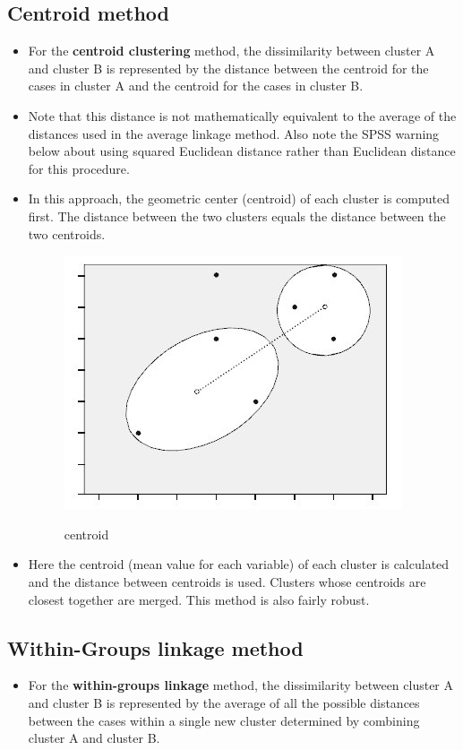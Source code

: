 \documentclass[a4paper,12pt]{article}
\begin{document}
\subsection{Centroid method}
\begin{itemize}
	\item For the \textbf{centroid clustering} method, the dissimilarity between cluster A and cluster B is represented by the distance between the centroid for the cases in cluster A and the centroid for the cases in cluster B.  
	\item Note that this distance is not mathematically equivalent to the average of the distances used in the average linkage method.  Also note the SPSS warning below about using squared Euclidean distance rather than Euclidean distance for this procedure.
	\item  In this approach, the geometric center (centroid) of each cluster is
	computed first. The distance between the two clusters equals the distance between
	the two centroids.
	\begin{figure}[h!]
		\begin{center}
			\includegraphics[scale=0.4]{images/Link4.jpg}\\
			\caption{centroid}
		\end{center}
	\end{figure}
	\item Here the centroid (mean value for 
	each variable) of each cluster is calculated and the
	distance between centroids is used. Clusters whose centroids are closest together are
	merged. This method is also fairly robust. 
\end{itemize}
\subsection{Within-Groups linkage method}
\begin{itemize}

	\item For the \textbf{within-groups linkage} method, the dissimilarity between cluster A and cluster B is represented by the average of all the possible distances between the cases within a single new cluster determined by combining cluster A and cluster B.
\end{itemize}	
	
\end{document}
